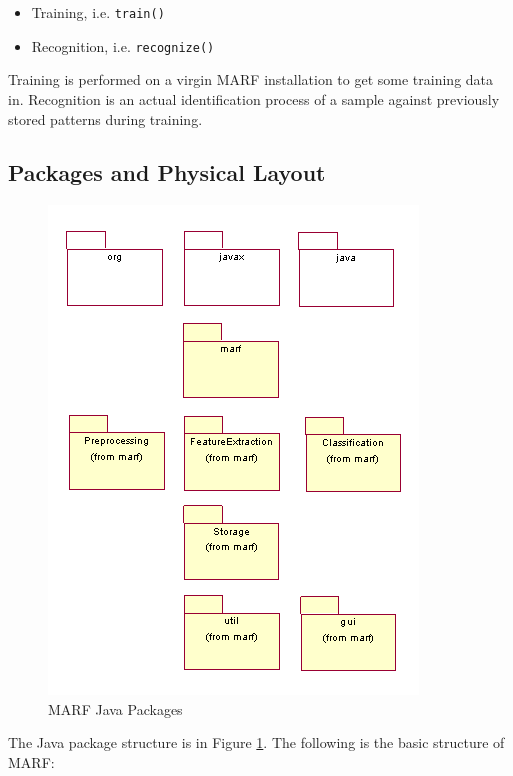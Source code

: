 \begin{itemize}
	\item Training, i.e. \verb+train()+
	\item Recognition, i.e. \verb+recognize()+
\end{itemize}

Training is performed on a virgin MARF installation to get
some training data in. Recognition is an actual identification process of a sample
against previously stored patterns during training.

\subsection{Packages and Physical Layout}

\begin{figure}
	\centering
	\includegraphics{../graphics/arch/packages.png}
	\caption{MARF Java Packages}
	\label{fig:packages}
\end{figure}

The Java package structure is in Figure \ref{fig:packages}.
The following is the basic structure of MARF:

